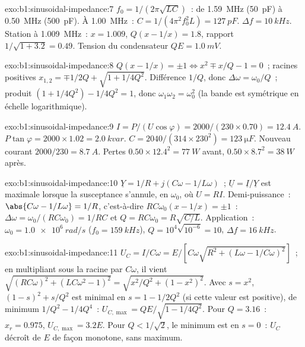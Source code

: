 \begin{solution}{exo:b1:sinusoidal-impedance:7}
$f_0 = 1/(2\pi\sqrt{LC})$~: de \qty{1.59}{MHz} (\qty{50}{pF}) à \qty{0.50}{MHz}
(\qty{500}{pF}). À \qty{1.00}{MHz}~: $C = 1/(4\pi^2f_0^2L) = \qty{127}{pF}$.
$\Delta f = \qty{10}{kHz}$. Station à \qty{1.009}{MHz}~: $x = 1.009$,
$Q(x - 1/x) = 1.8$, rapport $1/\sqrt{1 + 3.2} = 0.49$. Tension du
condensateur $QE = \qty{1.0}{mV}$.
\end{solution}

\begin{solution}{exo:b1:sinusoidal-impedance:8}
$Q(x - 1/x) = \pm1 \Leftrightarrow x^2 \mp x/Q - 1 = 0$~; racines positives
$x_{1,2} = \mp 1/2Q + \sqrt{1 + 1/4Q^2}$. Différence $1/Q$, donc
$\Delta\omega = \omega_0/Q$~; produit $(1 + 1/4Q^2) - 1/4Q^2 = 1$, donc
$\omega_1\omega_2 = \omega_0^2$ (la bande est symétrique en échelle logarithmique).
\end{solution}

\begin{solution}{exo:b1:sinusoidal-impedance:9}
$I = P/(U\cos\varphi) = 2000/(230 \times 0.70) = \qty{12.4}{A}$.  $P\tan\varphi = 2000 \times 1.02 = \qty{2.0}{kvar}$. $C = 2040/(314
\times 230^2) = \qty{123}{\micro F}$. Nouveau courant $2000/230 = \qty{8.7}{A}$.
Pertes $0.50 \times 12.4^2 = \qty{77}{W}$ avant, $0.50 \times 8.7^2 =
\qty{38}{W}$ après.
\end{solution}

\begin{solution}{exo:b1:sinusoidal-impedance:10}
$\underline Y = 1/R + j(C\omega - 1/L\omega)$~; $\underline U = \underline I/
\underline Y$ est maximale lorsque la susceptance s'annule, en $\omega_0$,
où $U = RI$. Demi-puissance~: $\abs{C\omega - 1/L\omega} = 1/R$, c'est-à-dire
$RC\omega_0(x - 1/x) = \pm1$~: $\Delta\omega = \omega_0/(RC\omega_0) = 1/RC$
et $Q = RC\omega_0 = R\sqrt{C/L}$. Application~: $\omega_0 = \qty{1.0e6}{rad/s}$
($f_0 = \qty{159}{kHz}$), $Q = 10^4\sqrt{10^{-6}} = 10$, $\Delta f =
\qty{16}{kHz}$.
\end{solution}

\begin{solution}{exo:b1:sinusoidal-impedance:11}
$U_C = I/C\omega = E/[C\omega\sqrt{R^2 + (L\omega - 1/C\omega)^2}]$~;
en multipliant sous la racine par $C\omega$, il vient
$\sqrt{(RC\omega)^2 + (LC\omega^2 - 1)^2} =
\sqrt{x^2/Q^2 + (1 - x^2)^2}$. Avec $s = x^2$, $(1 - s)^2 + s/Q^2$ est
minimal en $s = 1 - 1/2Q^2$ (si cette valeur est positive), de minimum $1/Q^2 - 1/4Q^4$~:
$U_{C,\max} = QE/\sqrt{1 - 1/4Q^2}$. Pour $Q = 3.16$~: $x_r = 0.975$,
$U_{C,\max} = 3.2E$. Pour $Q < 1/\sqrt2$, le minimum est en $s = 0$~: $U_C$
décroît de $E$ de façon monotone, sans maximum.
\end{solution}

